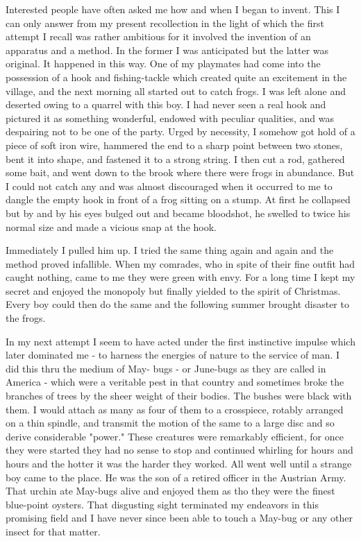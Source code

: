 \documentclass[a4paper,12pt,english,twoside,openright]{memoir}
\begin{document}
	Interested people have often asked me how and when I began to invent.  This I can only answer 
	from my present recollection in the light of which the first attempt I recall was rather ambitious for 
	it involved the invention of an apparatus and a method.  In the former I was anticipated but the 
	latter was original.  It happened in this way.  One of my playmates had come into the possession 
	of a hook and fishing-tackle which created quite an excitement in the village, and the next 
	morning all started out to catch frogs.  I was left alone and deserted owing to a quarrel with this 
	boy.  I had never seen a real hook and pictured it as something wonderful, endowed with peculiar 
	qualities, and was despairing not to be one of the party.  Urged by necessity, I somehow got hold 
	of a piece of soft iron wire, hammered the end to a sharp point between two stones, bent it into 
	shape, and fastened it to a strong string.  I then cut a rod, gathered some bait, and went down to 
	the brook where there were frogs in abundance.  But I could not catch any and was almost 
	discouraged when it occurred to me to dangle the empty hook in front of a frog sitting on a stump.  
	At first he collapsed but by and by his eyes bulged out and became bloodshot, he swelled to 
	twice his normal size and made a vicious snap at the hook.  
	
	Immediately I pulled him up.  I tried the same thing again and again and the method proved 
	infallible.  When my comrades, who in spite of their fine outfit had caught nothing, came to me 
	they were green with envy.  For a long time I kept my secret and enjoyed the monopoly but finally 
	yielded to the spirit of Christmas.  Every boy could then do the same and the following summer 
	brought disaster to the frogs.  
	
	In my next attempt I seem to have acted under the first instinctive impulse which later dominated 
	me - to harness the energies of nature to the service of man.  I did this thru the medium of May-
	bugs - or June-bugs as they are called in America - which were a veritable pest in that country 
	and sometimes broke the branches of trees by the sheer weight of their bodies.  The bushes 
	were black with them.  I would attach as many as four of them to a crosspiece, rotably arranged 
	on a thin spindle, and transmit the motion of the same to a large disc and so derive considerable 
	"power." These creatures were remarkably efficient, for once they were started they had no sense 
	to stop and continued whirling for hours and hours and the hotter it was the harder they worked.  
	All went well until a strange boy came to the place.  He was the son of a retired officer in the 
	Austrian Army.  That urchin ate May-bugs alive and enjoyed them as tho they were the finest 
	blue-point oysters.  That disgusting sight terminated my endeavors in this promising field and I 
	have never since been able to touch a May-bug or any other insect for that matter.  
	
\end{document}
